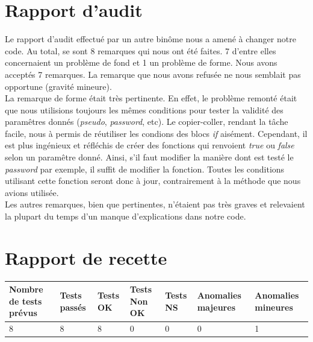 \documentclass[12pt,a4paper]{report}
\begin{document}
\chapter*{Rapport d'audit}
\label{chapter:Rapport d'audit} %
Le rapport d'audit effectué par un autre binôme nous a amené à changer notre code. Au total, se sont 8 remarques qui nous ont été faites. 7 d'entre elles concernaient un problème de fond et 1 un problème de forme. Nous avons acceptés 7 remarques. La remarque que nous avons refusée ne nous semblait pas opportune (gravité mineure). \\

La remarque de forme était très pertinente. En effet, le problème remonté était que nous utilisions toujours les mêmes conditions pour tester la validité des paramêtres donnés (\emph{pseudo}, \emph{password}, etc). Le copier-coller, rendant la tâche facile, nous à permis de réutiliser les condions des blocs \emph{if} aisément. Cependant, il est plus ingénieux et réfléchis de créer des fonctions qui renvoient \emph{true} ou \emph{false} selon un paramêtre donné. Ainsi, s'il faut modifier la manière dont est testé le \emph{password} par exemple, il suffit de modifier la fonction. Toutes les conditions utilisant cette fonction seront donc à jour, contrairement à la méthode que nous avions utilisée.\\

Les autres remarques, bien que pertinentes, n'étaient pas très graves et relevaient la plupart du temps d'un manque d'explications dans notre code.

\chapter*{Rapport de recette}
\label{chapter:Rapport de recette} %

\begin{tabular}{|p{2.1cm}|p{1.5cm}|p{1.5cm}|p{1.5cm}|p{1.5cm}|p{2cm}|p{2cm}|}
\hline 
Nombre de tests prévus & Tests passés & Tests OK & Tests Non OK & Tests NS & Anomalies majeures & Anomalies mineures \\ 
\hline 
8 & 8 & 8 & 0 & 0 & 0 & 1 \\ 
\hline 
\end{tabular} 
\end{document}
